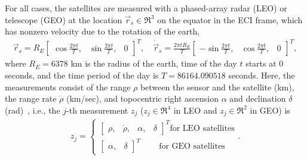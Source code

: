 For all cases, the satellites are measured with a phased-array radar (LEO) or telescope (GEO) at the location $\vec r_s\in\Re^3$ on the equator in the ECI frame, which has nonzero velocity due to the rotation of the earth,
\begin{align}
\vec r_s=R_E
\begin{bmatrix}
\cos\frac{2\pi t}T, & \sin\frac{2\pi t}T, & 0
\end{bmatrix}^T,
\quad
\dot{\vec r}_s=\frac{2\pi tR_E}T
\begin{bmatrix}
-\sin\frac{2\pi t}T,  & \cos\frac{2\pi t}T, & 0
\end{bmatrix}^T,
\end{align}
where $R_E=6378$ km is the radius of the earth, time of the day $t$ starts at $0$ seconds, and the time period of the day is $T=86164.090518$ seconds.
Here, the measurements consist of the range $\rho$ between the sensor and the satellite (km), the range rate $\dot\rho$ (km/sec), and topocentric right ascension $\alpha$ and declination $\delta$ (rad)~\cite{Val01}, i.e., the $j$-th measurement $z_j$ ($z_j\in\Re^4$ in LEO and $z_j\in\Re^2$ in GEO) is
\begin{align}
\label{eqn:zj}
z_j=\begin{cases}
                        \begin{bmatrix}\rho, & \dot\rho, & \alpha, & \delta\end{bmatrix}^T \text{for LEO satellites} \\
                        \begin{bmatrix}\alpha, & \delta\end{bmatrix}^T \qquad\  \text{for GEO satellites}
                    \end{cases}
.
\end{align}


